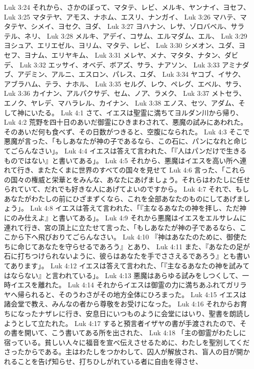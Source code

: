 Luk 3:24  それから、さかのぼって、マタテ、レビ、メルキ、ヤンナイ、ヨセフ、
Luk 3:25  マタテヤ、アモス、ナホム、エスリ、ナンガイ、
Luk 3:26  マハテ、マタテヤ、シメイ、ヨセク、ヨダ、
Luk 3:27  ヨハナン、レサ、ゾロバベル、サラテル、ネリ、
Luk 3:28  メルキ、アデイ、コサム、エルマダム、エル、
Luk 3:29  ヨシュア、エリエゼル、ヨリム、マタテ、レビ、
Luk 3:30  シメオン、ユダ、ヨセフ、ヨナム、エリヤキム、
Luk 3:31  メレヤ、メナ、マタタ、ナタン、ダビデ、
Luk 3:32  エッサイ、オベデ、ボアズ、サラ、ナアソン、
Luk 3:33  アミナダブ、アデミン、アルニ、エスロン、パレス、ユダ、
Luk 3:34  ヤコブ、イサク、アブラハム、テラ、ナホル、
Luk 3:35  セルグ、レウ、ペレグ、エベル、サラ、
Luk 3:36  カイナン、アルパクサデ、セム、ノア、ラメク、
Luk 3:37  メトセラ、エノク、ヤレデ、マハラレル、カイナン、
Luk 3:38  エノス、セツ、アダム、そして神にいたる。
Luk 4:1  さて、イエスは聖霊に満ちてヨルダン川から帰り、
Luk 4:2  荒野を四十日のあいだ御霊にひきまわされて、悪魔の試みにあわれた。そのあいだ何も食べず、その日数がつきると、空腹になられた。
Luk 4:3  そこで悪魔が言った、「もしあなたが神の子であるなら、この石に、パンになれと命じてごらんなさい」。
Luk 4:4  イエスは答えて言われた、「『人はパンだけで生きるものではない』と書いてある」。
Luk 4:5  それから、悪魔はイエスを高い所へ連れて行き、またたくまに世界のすべての国々を見せて
Luk 4:6  言った、「これらの国々の権威と栄華とをみんな、あなたにあげましょう。それらはわたしに任せられていて、だれでも好きな人にあげてよいのですから。
Luk 4:7  それで、もしあなたがわたしの前にひざまずくなら、これを全部あなたのものにしてあげましょう」。
Luk 4:8  イエスは答えて言われた、「『主なるあなたの神を拝し、ただ神にのみ仕えよ』と書いてある」。
Luk 4:9  それから悪魔はイエスをエルサレムに連れて行き、宮の頂上に立たせて言った、「もしあなたが神の子であるなら、ここから下へ飛びおりてごらんなさい。
Luk 4:10  『神はあなたのために、御使たちに命じてあなたを守らせるであろう』とあり、
Luk 4:11  また、『あなたの足が石に打ちつけられないように、彼らはあなたを手でささえるであろう』とも書いてあります」。
Luk 4:12  イエスは答えて言われた、「『主なるあなたの神を試みてはならない』と言われている」。
Luk 4:13  悪魔はあらゆる試みをしつくして、一時イエスを離れた。
Luk 4:14  それからイエスは御霊の力に満ちあふれてガリラヤへ帰られると、そのうわさがその地方全体にひろまった。
Luk 4:15  イエスは諸会堂で教え、みんなの者から尊敬をお受けになった。
Luk 4:16  それからお育ちになったナザレに行き、安息日にいつものように会堂にはいり、聖書を朗読しようとして立たれた。
Luk 4:17  すると預言者イザヤの書が手渡されたので、その書を開いて、こう書いてある所を出された、
Luk 4:18  「主の御霊がわたしに宿っている。貧しい人々に福音を宣べ伝えさせるために、わたしを聖別してくださったからである。主はわたしをつかわして、囚人が解放され、盲人の目が開かれることを告げ知らせ、打ちひしがれている者に自由を得させ、
